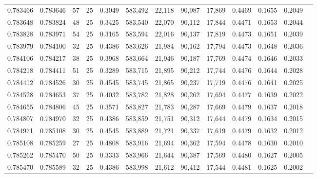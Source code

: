 \begin{tabular}{rrrrrrrrrrrrr}
0.783466 & 0.783646 &    57 &  25 &                                     0.3049 & 583,492 &  22,118 &  90,087 &  17,869 & 0.4469 & 0.1655 & 0.2049 \\
0.783648 & 0.783824 &    48 &  25 &                                     0.3425 & 583,540 &  22,070 &  90,112 &  17,844 & 0.4471 & 0.1653 & 0.2044 \\
0.783828 & 0.783971 &    54 &  25 &                                     0.3165 & 583,594 &  22,016 &  90,137 &  17,819 & 0.4473 & 0.1651 & 0.2039 \\
0.783979 & 0.784100 &    32 &  25 &                                     0.4386 & 583,626 &  21,984 &  90,162 &  17,794 & 0.4473 & 0.1648 & 0.2036 \\
0.784106 & 0.784217 &    38 &  25 &                                     0.3968 & 583,664 &  21,946 &  90,187 &  17,769 & 0.4474 & 0.1646 & 0.2033 \\
0.784218 & 0.784411 &    51 &  25 &                                     0.3289 & 583,715 &  21,895 &  90,212 &  17,744 & 0.4476 & 0.1644 & 0.2028 \\
0.784412 & 0.784526 &    30 &  25 &                                     0.4545 & 583,745 &  21,865 &  90,237 &  17,719 & 0.4476 & 0.1641 & 0.2025 \\
0.784528 & 0.784653 &    37 &  25 &                                     0.4032 & 583,782 &  21,828 &  90,262 &  17,694 & 0.4477 & 0.1639 & 0.2022 \\
0.784655 & 0.784806 &    45 &  25 &                                     0.3571 & 583,827 &  21,783 &  90,287 &  17,669 & 0.4479 & 0.1637 & 0.2018 \\
0.784807 & 0.784970 &    32 &  25 &                                     0.4386 & 583,859 &  21,751 &  90,312 &  17,644 & 0.4479 & 0.1634 & 0.2015 \\
0.784971 & 0.785108 &    30 &  25 &                                     0.4545 & 583,889 &  21,721 &  90,337 &  17,619 & 0.4479 & 0.1632 & 0.2012 \\
0.785108 & 0.785259 &    27 &  25 &                                     0.4808 & 583,916 &  21,694 &  90,362 &  17,594 & 0.4478 & 0.1630 & 0.2010 \\
0.785262 & 0.785470 &    50 &  25 &                                     0.3333 & 583,966 &  21,644 &  90,387 &  17,569 & 0.4480 & 0.1627 & 0.2005 \\
0.785470 & 0.785589 &    32 &  25 &                                     0.4386 & 583,998 &  21,612 &  90,412 &  17,544 & 0.4481 & 0.1625 & 0.2002 \\

\end{tabular}
